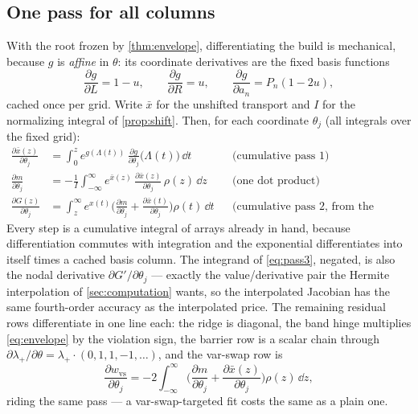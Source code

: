 \subsection{One pass for all columns}

With the root frozen by \cref{thm:envelope}, differentiating the build is
mechanical, because $g$ is \emph{affine} in $\theta$: its coordinate
derivatives are the fixed basis functions
\[
\frac{\partial g}{\partial L}=1-u,
\qquad
\frac{\partial g}{\partial R}=u,
\qquad
\frac{\partial g}{\partial a_n}=P_n(1-2u),
\]
cached once per grid.  Write $\bar{x}$ for the unshifted transport and
$I$ for the normalizing integral of \cref{prop:shift}.  Then, for each
coordinate $\theta_j$ (all integrals over the fixed grid):
\begin{align}
\frac{\partial \bar{x}(z)}{\partial\theta_j}
&=\int_0^{z}e^{g(\Lambda(t))}\,
\frac{\partial g}{\partial\theta_j}\big(\Lambda(t)\big)\,\dd t
&&\text{(cumulative pass 1)}
\label{eq:pass1}\\
\frac{\partial m}{\partial\theta_j}
&=-\frac{1}{I}\int_{-\infty}^{\infty}
e^{\bar{x}(z)}\,\frac{\partial\bar{x}(z)}{\partial\theta_j}\,
\rho(z)\,\dd z
&&\text{(one dot product)}
\label{eq:pass2}\\
\frac{\partial G(z)}{\partial\theta_j}
&=\int_z^{\infty}e^{x(t)}
\Big(\frac{\partial m}{\partial\theta_j}
+\frac{\partial\bar{x}(t)}{\partial\theta_j}\Big)\rho(t)\,\dd t
&&\text{(cumulative pass 2, from the right).}
\label{eq:pass3}
\end{align}
Every step is a cumulative integral of arrays already in hand, because
differentiation commutes with integration and the exponential
differentiates into itself times a cached basis column.  The integrand of
\eqref{eq:pass3}, negated, is also the nodal derivative
$\partial G'/\partial\theta_j$ --- exactly the value/derivative pair the
Hermite interpolation of \cref{sec:computation} wants, so the
interpolated Jacobian has the same fourth-order accuracy as the
interpolated price.  The remaining residual rows differentiate in one
line each: the ridge is diagonal, the band hinge multiplies
\eqref{eq:envelope} by the violation sign, the barrier row is a scalar
chain through $\partial\lambda_+/\partial\theta
=\lambda_+\cdot(0,1,1,-1,\dots)$, and the var-swap row is
\begin{equation}
\frac{\partial w_{\mathrm{vs}}}{\partial\theta_j}
=-2\int_{-\infty}^{\infty}
\Big(\frac{\partial m}{\partial\theta_j}
+\frac{\partial\bar{x}(z)}{\partial\theta_j}\Big)\rho(z)\,\dd z,
\label{eq:varswaprow}
\end{equation}
riding the same pass --- a var-swap-targeted fit costs the same as a
plain one.

